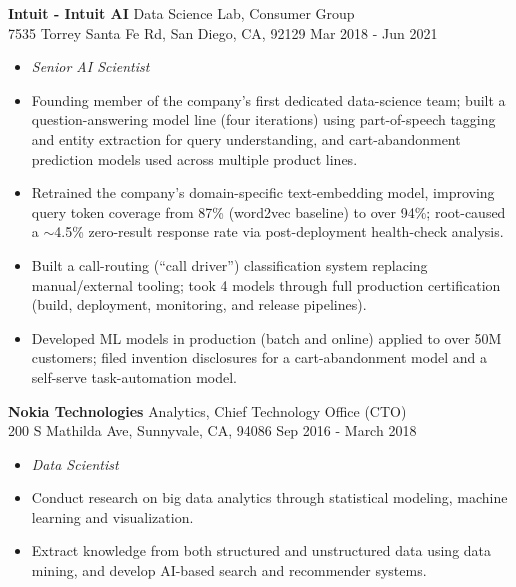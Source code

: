 \documentclass[10pt]{article}
\newenvironment{innerlist}[1][\enskip\textbullet]%
        {\begin{itemize}[#1,leftmargin=*,parsep=0pt,itemsep=0pt,topsep=0pt,partopsep=0pt]}
        {\end{itemize}}
\begin{document}
\textbf{Intuit - Intuit AI} \hfill{Data Science Lab, Consumer Group}\\7535 Torrey Santa Fe Rd, San Diego, CA, 92129 \hfill {Mar 2018 - Jun 2021}
\begin{innerlist}
\item[] \emph{Senior AI Scientist}
   \item[--] Founding member of the company's first dedicated data-science team; built a question-answering model line (four iterations) using part-of-speech tagging and entity extraction for query understanding, and cart-abandonment prediction models used across multiple product lines.
   \item[--] Retrained the company's domain-specific text-embedding model, improving query token coverage from 87\% (word2vec baseline) to over 94\%; root-caused a $\sim$4.5\% zero-result response rate via post-deployment health-check analysis.
   \item[--] Built a call-routing (``call driver'') classification system replacing manual/external tooling; took 4 models through full production certification (build, deployment, monitoring, and release pipelines).
   \item[--] Developed ML models in production (batch and online) applied to over 50M customers; filed invention disclosures for a cart-abandonment model and a self-serve task-automation model.
   \\
\end{innerlist}

\textbf{Nokia Technologies} \hfill{Analytics, Chief Technology Office (CTO)}\\200 S Mathilda Ave, Sunnyvale, CA, 94086 \hfill {Sep 2016 - March 2018}
\begin{innerlist}
\item[] \emph{Data Scientist}
   \item[--] Conduct research on big data analytics through statistical modeling, machine learning and visualization.
   \item[--] Extract knowledge from both structured and unstructured data using data mining, and develop AI-based search and recommender systems.
   \\
\end{innerlist}
\end{document}
